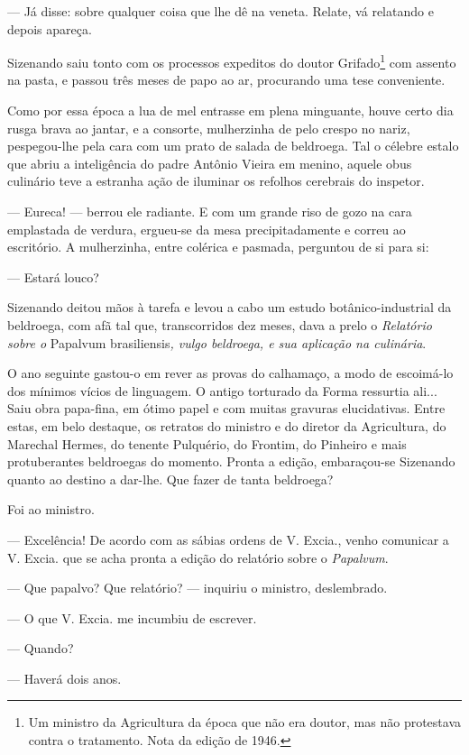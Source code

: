 --- Já disse: sobre qualquer coisa que lhe dê na veneta. Relate, vá
relatando e depois apareça.

Sizenando saiu tonto com os processos expeditos do doutor
Grifado\footnote{Um ministro da Agricultura da época que não era doutor,
  mas não protestava contra o tratamento. Nota da edição de 1946.} com
assento na pasta, e passou três meses de papo ao ar, procurando uma tese
conveniente.

Como por essa época a lua de mel entrasse em plena minguante, houve
certo dia rusga brava ao jantar, e a consorte, mulherzinha de pelo
crespo no nariz, pespegou-lhe pela cara com um prato de salada de
beldroega. Tal o célebre estalo que abriu a inteligência do padre
Antônio Vieira em menino, aquele obus culinário teve a estranha ação de
iluminar os refolhos cerebrais do inspetor.

--- Eureca! --- berrou ele radiante. E com um grande riso de gozo na
cara emplastada de verdura, ergueu-se da mesa precipitadamente e correu
ao escritório. A mulherzinha, entre colérica e pasmada, perguntou de si
para si:

--- Estará louco?

Sizenando deitou mãos à tarefa e levou a cabo um estudo
botânico-industrial da beldroega, com afã tal que, transcorridos dez
meses, dava a prelo o \emph{Relatório sobre o} Papalvum
brasiliensis\emph{, vulgo beldroega, e sua aplicação na culinária}.

O ano seguinte gastou-o em rever as provas do calhamaço, a modo de
escoimá-lo dos mínimos vícios de linguagem. O antigo torturado da Forma
ressurtia ali... Saiu obra papa-fina, em ótimo papel e com muitas
gravuras elucidativas. Entre estas, em belo destaque, os retratos do
ministro e do diretor da Agricultura, do Marechal Hermes, do tenente
Pulquério, do Frontim, do Pinheiro e mais protuberantes beldroegas do
momento. Pronta a edição, embaraçou-se Sizenando quanto ao destino a
dar-lhe. Que fazer de tanta beldroega?

Foi ao ministro.

--- Excelência! De acordo com as sábias ordens de V. Excia., venho
comunicar a V. Excia. que se acha pronta a edição do relatório sobre o
\emph{Papalvum}.

--- Que papalvo? Que relatório? --- inquiriu o ministro, deslembrado.

--- O que V. Excia. me incumbiu de escrever.

--- Quando?

--- Haverá dois anos.

